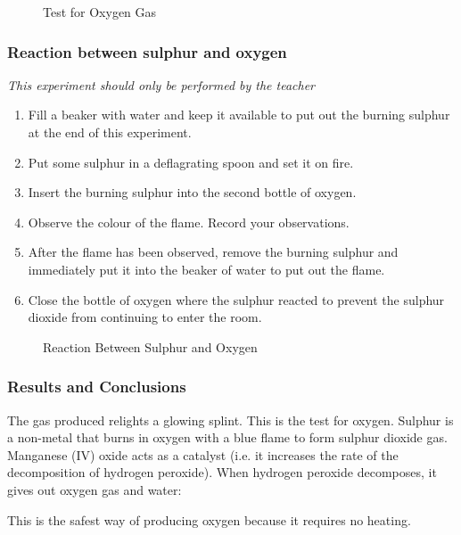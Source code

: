 \begin{figure}[h]
\begin{center}
\def\svgwidth{50pt}

\caption{Test for Oxygen Gas}
\label{fig:glowing-splint_oxygen-test}
\end{center}
\end{figure}

\subsubsection*{Reaction between sulphur and oxygen}
\textit{This experiment should only be performed by the teacher}
\begin{enumerate}
\item{Fill a beaker with water and keep it available to put out the burning sulphur at the end of this experiment.}
\item{Put some sulphur in a deflagrating spoon and set it on fire.}
\item{Insert the burning sulphur into the second bottle of oxygen.}
\item{Observe the colour of the flame. Record your observations.}
\item{After the flame has been observed, remove the burning sulphur and immediately put it into the beaker of water to put out the flame.}
\item{Close the bottle of oxygen where the sulphur reacted to prevent the sulphur dioxide from continuing to enter the room.}
\end{enumerate}
\begin{figure}[h]
\begin{center}
\caption{Reaction Between Sulphur and Oxygen}
\label{fig:sulphur_and_oxygen}
\end{center}
\end{figure}

\subsubsection*{Results and Conclusions}
The gas produced relights a glowing splint. This is the test for oxygen. Sulphur is a non-metal that burns in oxygen with a blue flame to form sulphur dioxide gas. Manganese (IV) oxide acts as a catalyst (i.e. it increases the rate of the decomposition of hydrogen peroxide). When hydrogen peroxide decomposes, it gives out oxygen gas and water:
\begin{center}
\end{center}
This is the safest way of producing oxygen because it requires no heating.

